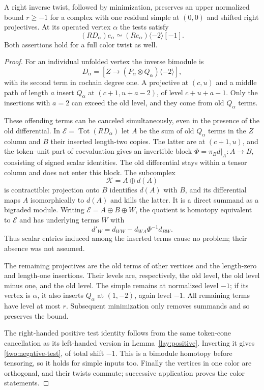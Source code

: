 \begin{lemma}
\label{two:negative-bound}
A right inverse twist, followed by minimization, preserves an upper
normalized bound $r\ge-1$ for a complex with one residual simple
at $(0,0)$ and shifted right projectives.  At its operated vertex
$\alpha$ the tests satisfy
\begin{equation}
 (R D_\alpha)e_\alpha
       \simeq (Re_\alpha)\langle-2\rangle[-1].
 \label{two:negative-test}
\end{equation}
Both assertions hold for a full color twist as well.
\end{lemma}
\begin{proof}
For an individual unfolded vertex the inverse bimodule is
\[
 D_\alpha=[Z\longrightarrow
              (P_\alpha\otimes Q_\alpha)\langle-2\rangle],
\]
with its second term in cochain degree one.  A projective at
$(c,u)$ and a middle path of length $a$ insert $Q_\alpha$ at
$(c+1,u+a-2)$, of level $c+u+a-1$.  Only the insertions with
$a=2$ can exceed the old level, and they come from old
$Q_\alpha$ terms.

These offending terms can be canceled simultaneously, even in the
presence of the old differential.  In $\mathcal E=\operatorname{Tot}
(R D_\alpha)$ let $A$ be the sum of old $Q_\alpha$ terms in the
$Z$ column and $B$ their inserted length-two copies.  The latter
are at $(c+1,u)$, and the token--unit part of coevaluation gives
an invertible block
$\Phi=\pi_Bd|_A:A\to B$, consisting of signed scalar identities.
The old differential stays within a tensor column and does not
enter this block.  The subcomplex
\[
 \mathcal K=A\oplus d(A)
\]
is contractible: projection onto $B$ identifies $d(A)$ with $B$,
and its differential maps $A$ isomorphically to $d(A)$ and kills
the latter.  It is a direct summand as a bigraded module.
Writing $\mathcal E=A\oplus B\oplus W$, the quotient is homotopy
equivalent to $\mathcal E$ and has underlying terms $W$ with
\begin{equation}
 d'_W=d_{WW}-d_{WA}\Phi^{-1}d_{BW}.
 \label{two:pivot}
\end{equation}
Thus scalar entries induced among the inserted terms cause no
problem; their absence was not assumed.

The remaining projectives are the old terms of other vertices and
the length-zero and length-one insertions.  Their levels are,
respectively, the old level, the old level minus one, and the old
level.  The simple remains at normalized level $-1$; if its vertex
is $\alpha$, it also inserts $Q_\alpha$ at $(1,-2)$, again level
$-1$.  All remaining terms have level at most $r$.  Subsequent
minimization only removes summands and so preserves the bound.

The right-handed positive test identity follows from the same
token-cone cancellation as its left-handed version in
Lemma~\ref{lay:positive}.  Inverting it gives
\eqref{two:negative-test}, of total shift $-1$.  This is a bimodule
homotopy before tensoring, so it holds for simple inputs too.
Finally the vertices in one color are orthogonal, and their twists
commute; successive application proves the color statements.
\end{proof}

